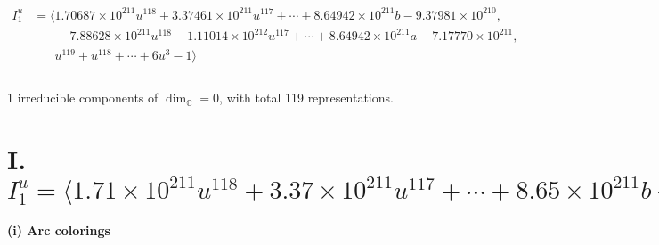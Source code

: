 \documentclass[1p]{elsarticle_modified}
\theoremstyle{definition}
\begin{document}
\begin{align*}
I^u_{1}&=\langle 
1.70687\times10^{211} u^{118}+3.37461\times10^{211} u^{117}+\cdots+8.64942\times10^{211} b-9.37981\times10^{210},\\
\phantom{I^u_{1}}&\phantom{= \langle  }-7.88628\times10^{211} u^{118}-1.11014\times10^{212} u^{117}+\cdots+8.64942\times10^{211} a-7.17770\times10^{211},\\
\phantom{I^u_{1}}&\phantom{= \langle  }u^{119}+u^{118}+\cdots+6 u^3-1\rangle \\
\\
\end{align*}
\raggedright * 1 irreducible components of $\dim_{\mathbb{C}}=0$, with total 119 representations.\\
\newpage
\renewcommand{\arraystretch}{1}
\centering \section*{I. $I^u_{1}= \langle 1.71\times10^{211} u^{118}+3.37\times10^{211} u^{117}+\cdots+8.65\times10^{211} b-9.38\times10^{210},\;-7.89\times10^{211} u^{118}-1.11\times10^{212} u^{117}+\cdots+8.65\times10^{211} a-7.18\times10^{211},\;u^{119}+u^{118}+\cdots+6 u^3-1 \rangle$}
\flushleft \textbf{(i) Arc colorings}\\
\end{document}
